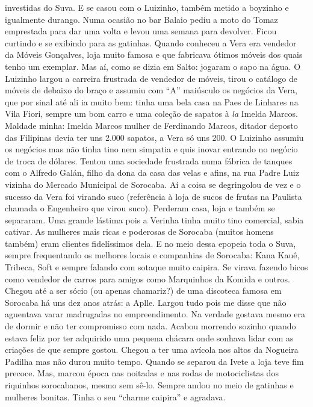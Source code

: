 \documentclass[12pt,brazil,]{book}
\begin{document}
investidas do Suva. E se casou com o Luizinho, também metido a boyzinho
e igualmente durango. Numa ocasião no bar Balaio pediu a moto do Tomaz
emprestada para dar uma volta e levou uma semana para devolver. Ficou
curtindo e se exibindo para as gatinhas. Quando conheceu a Vera era
vendedor da Móveis Gonçalves, loja muito famosa e que fabricava ótimos
móveis dos quais tenho um exemplar. Mas aí, como se dizia em Salto:
jogaram o sapo na água. O Luizinho largou a carreira frustrada de
vendedor de móveis, tirou o catálogo de móveis de debaixo do braço e
assumiu com ``A'' maiúsculo os negócios da Vera, que por sinal até ali
ia muito bem: tinha uma bela casa na Paes de Linhares na Vila Fiori,
sempre um bom carro e uma coleção de sapatos à \emph{la} Imelda Marcos.
Maldade minha: Imelda Marcos mulher de Ferdinando Marcos, ditador
deposto das Filipinas devia ter uns 2.000 sapatos, a Vera só uns 200. O
Luizinho assumiu os negócios mas não tinha tino nem simpatia e quis
inovar entrando no negócio de troca de dólares. Tentou uma sociedade
frustrada numa fábrica de tanques com o Alfredo Galán, filho da dona da
casa das velas e afins, na rua Padre Luiz vizinha do Mercado Municipal
de Sorocaba. Aí a coisa se degringolou de vez e o sucesso da Vera foi
virando suco (referência à loja de sucos de frutas na Paulista chamada o
Engenheiro que virou suco). Perderam casa, loja e também se separaram.
Uma grande lástima pois a Verinha tinha muito tino comercial, sabia
cativar. As mulheres mais ricas e poderosas de Sorocaba (muitos homens
também) eram clientes fidelíssimos dela. E no meio dessa epopeia toda o
Suva, sempre frequentando os melhores locais e companhias de Sorocaba:
Kana Kauê, Tribeca, Soft e sempre falando com sotaque muito caipira. Se
virava fazendo bicos como vendedor de carros para amigos como Marquinhos
da Komida e outros. Chegou até a ser sócio (ou apenas chamariz?) de uma
discoteca famosa em Sorocaba há uns dez anos atrás: a Aplle. Largou tudo
pois me disse que não aguentava varar madrugadas no empreendimento. Na
verdade gostava mesmo era de dormir e não ter compromisso com nada.
Acabou morrendo sozinho quando estava feliz por ter adquirido uma
pequena chácara onde sonhava lidar com as criações de que sempre gostou.
Chegou a ter uma avícola nos altos da Nogueira Padilha mas não durou
muito tempo. Quando se separou da Ivete a loja teve fim precoce. Mas,
marcou época nas noitadas e nas rodas de motociclistas dos riquinhos
sorocabanos, mesmo sem sê-lo. Sempre andou no meio de gatinhas e
mulheres bonitas. Tinha o seu ``charme caipira'' e agradava.
\end{document}
